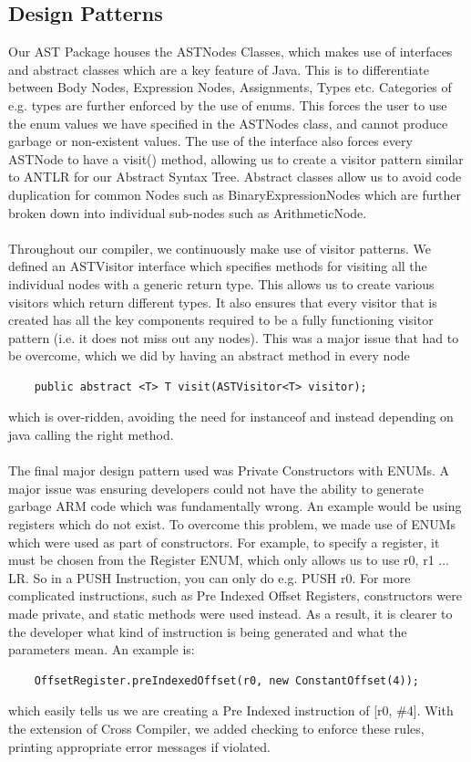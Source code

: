\documentclass[5pt]{article}
\begin{document}
\subsection{Design Patterns}
Our AST Package houses the ASTNodes Classes, which makes use of interfaces and abstract classes which are a key feature of Java. This is to differentiate between Body Nodes, Expression Nodes, Assignments, Types etc. Categories of e.g. types are further enforced by the use of enums. This forces the user to use the enum values we have specified in the ASTNodes class, and cannot produce garbage or non-existent values. The use of the interface also forces every ASTNode to have a visit() method, allowing us to create a visitor pattern similar to ANTLR for our Abstract Syntax Tree. Abstract classes allow us to avoid code duplication for common Nodes such as BinaryExpressionNodes which are further broken down into individual sub-nodes such as ArithmeticNode.
\\ \\
Throughout our compiler, we continuously make use of visitor patterns. We defined an ASTVisitor interface which specifies methods for visiting all the individual nodes with a generic return type. This allows us to create various visitors which return different types. It also ensures that every visitor that is created has all the key components required to be a fully functioning visitor pattern (i.e. it does not miss out any nodes). This was a major issue that had to be overcome, which we did by having an abstract method in every node

\begin{lstlisting}
    public abstract <T> T visit(ASTVisitor<T> visitor);
\end{lstlisting}

which is over-ridden, avoiding the need for instanceof and instead depending on java calling the right method.
\\ \\
The final major design pattern used was Private Constructors with ENUMs. A major issue was ensuring developers could not have the ability to generate garbage ARM code which was fundamentally wrong. An example would be using registers which do not exist. To overcome this problem, we made use of ENUMs which were used as part of constructors. For example, to specify a register, it must be chosen from the Register ENUM, which only allows us to use r0, r1 ... LR. So in a PUSH Instruction, you can only do e.g. PUSH r0. For more complicated instructions, such as Pre Indexed Offset Registers, constructors were made private, and static methods were used instead. As a result, it is clearer to the developer what kind of instruction is being generated and what the parameters mean. An example is:
\begin{lstlisting}
    OffsetRegister.preIndexedOffset(r0, new ConstantOffset(4));
\end{lstlisting}
which easily tells us we are creating a Pre Indexed instruction of [r0, \#4]. With the extension of Cross Compiler, we added checking to enforce these rules, printing appropriate error messages if violated.
\end{document}
